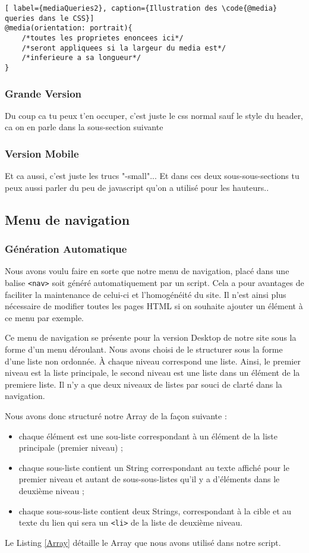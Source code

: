 \documentclass{scrartcl}
\newcommand{\code}[1]{\texttt{#1}}
\begin{document}
\begin{lstlisting}[ label={mediaQueries2}, caption={Illustration des \code{@media} queries dans le CSS}]
@media(orientation: portrait){
	/*toutes les proprietes enoncees ici*/
	/*seront appliquees si la largeur du media est*/
	/*inferieure a sa longueur*/
}
\end{lstlisting}


\subsubsection{Grande Version}
Du coup ca tu peux t'en occuper, c'est juste le css normal sauf le style du header, ca on en parle dans la sous-section suivante
\subsubsection{Version Mobile}
Et ca aussi, c'est juste les trucs "-small"...
Et dans ces deux sous-sous-sections tu peux aussi parler du peu de javascript qu'on a utilisé pour les hauteurs..

\subsection{Menu de navigation}
\subsubsection{Génération Automatique}
Nous avons voulu faire en sorte que notre menu de navigation, placé dans une balise \code{<nav>} soit généré automatiquement par un script. Cela a pour avantages de faciliter la maintenance de celui-ci et l'homogénéité du site. Il n'est ainsi plus nécessaire de modifier toutes les pages HTML si on souhaite ajouter un élément à ce menu par exemple. 


Ce menu de navigation se présente pour la version Desktop de notre site sous la forme d'un menu déroulant. Nous avons choisi de le structurer sous la forme d'une liste non ordonnée. À chaque niveau correspond une liste. Ainsi, le premier niveau est la liste principale, le second niveau est une liste dans un élément de la premiere liste. Il n'y a que deux niveaux de listes par souci de clarté dans la navigation.

Nous avons donc structuré notre Array de la façon suivante : 
\begin{itemize}
\item chaque élément est une sou-liste correspondant à un élément de la liste principale (premier niveau) ; 
\item chaque sous-liste contient un String correspondant au texte affiché pour le premier niveau et autant de sous-sous-listes qu'il y a d'éléments dans le deuxième niveau ; 
\item chaque sous-sous-liste contient deux Strings, correspondant à la cible et au texte du lien qui sera un \code{<li>} de la liste de deuxième niveau.
\end{itemize}
Le Listing \ref{Array} détaille le Array que nous avons utilisé dans notre script.
\end{document}
